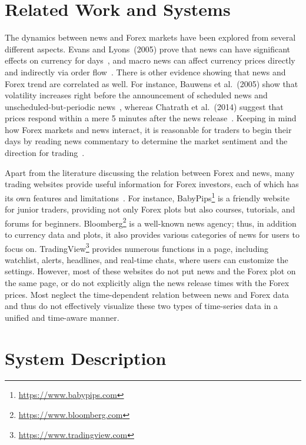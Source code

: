\documentclass[sigconf]{acmart}
\begin{document}
\section{Related Work and Systems}\label{sec:related}
The dynamics between news and Forex markets have been explored from several
different aspects.
Evans and Lyons~(2005) prove that news can have significant effects on currency
for days~\cite{EVANS2005197}, and macro news can affect currency prices
directly and indirectly via order flow~\cite{EVANS200826}.
There is other evidence showing that news and Forex trend are correlated as well.
For instance, Bauwens et al.~(2005) show that volatility increases right
before the announcement of scheduled news and unscheduled-but-periodic
news~\cite{BAUWENS20051108}, whereas Chatrath et al.~(2014) suggest that prices
respond within a mere 5 minutes after the news release~\cite{CHATRATH201442}.
Keeping in mind how Forex markets and news interact, it is reasonable for traders
to begin their days by reading news commentary to determine the market
sentiment and the direction for trading~\cite{samuels2015trader}.

Apart from the literature discussing the relation between Forex and news, 
many trading websites provide useful information for Forex investors,
each of which has its own features and limitations~\cite{ForexWebsites}.
For instance, BabyPips\footnote{\url{https://www.babypips.com}} is a friendly
website for junior traders, providing not only Forex plots but also courses,
tutorials, and forums for beginners.
Bloomberg\footnote{\url{https://www.bloomberg.com}} is a well-known news
agency; thus, in addition to currency data and plots, it also provides various
categories of news for users to focus on.
TradingView\footnote{\url{https://www.tradingview.com}} provides numerous
functions in a page, including watchlist, alerts, headlines, and real-time chats,
where users can customize the settings. 
However, most of these websites do not put news and the Forex plot on the same
page, or do not explicitly align the news release times with the Forex prices.
Most neglect the time-dependent relation between news and Forex data
and thus do not effectively visualize these two types of time-series data in a
unified and time-aware manner. 


\section{System Description}\label{sec:system}
\end{document}
